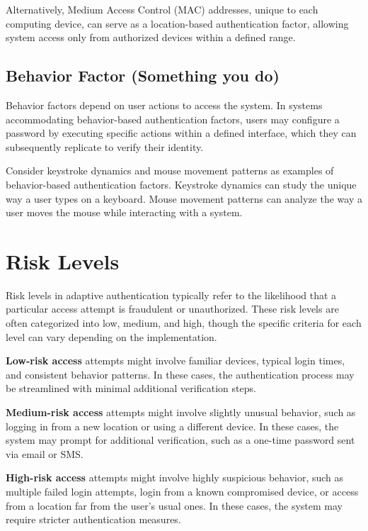 Alternatively, Medium Access Control (MAC) addresses, unique to each computing device, can serve as a location-based authentication factor, allowing system access only from authorized devices within a defined range.

\newpage
\subsection{Behavior Factor (Something you do)}
Behavior factors depend on user actions to access the system. In systems accommodating behavior-based authentication factors, users may configure a password by executing specific actions within a defined interface, which they can subsequently replicate to verify their identity.

Consider keystroke dynamics and mouse movement patterns as examples of behavior-based authentication factors.
Keystroke dynamics can study the unique way a user types on a keyboard.
Mouse movement patterns can analyze the way a user moves the mouse while interacting with a system. \cite{auth-factors-aratek} \cite{auth-factors-sumologic} \cite{auth-factors-globalknowledge} 

\section{Risk Levels}
Risk levels in adaptive authentication typically refer to the likelihood that a particular access attempt is fraudulent or unauthorized.
These risk levels are often categorized into low, medium, and high, though the specific criteria for each level can vary depending on the implementation.

\textbf{Low-risk access} attempts might involve familiar devices, typical login times, and consistent behavior patterns. In these cases, the authentication process may be streamlined with minimal additional verification steps.

\textbf{Medium-risk access} attempts might involve slightly unusual behavior, such as logging in from a new location or using a different device.
In these cases, the system may prompt for additional verification, such as a one-time password sent via email or SMS.

\textbf{High-risk access} attempts might involve highly suspicious behavior, such as multiple failed login attempts, login from a known compromised device, or access from a location far from the user's usual ones.
In these cases, the system may require stricter authentication measures.

\shorthandon{-}